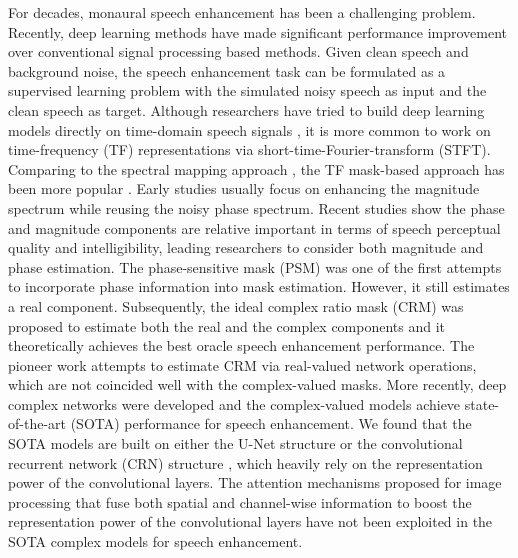 \documentclass{article}
\begin{document}
For decades, monaural speech enhancement has been a challenging problem. Recently, deep learning methods have made significant performance improvement over conventional signal processing based methods. Given clean speech and background noise, the speech enhancement task can be formulated as a supervised learning problem with the simulated noisy speech as input and the clean speech as target. Although researchers have tried to build deep learning models directly on time-domain speech signals \cite{Pascual2017, Rethage2018, Luo2019}, it is more common to work on time-frequency (TF) representations via short-time-Fourier-transform (STFT). Comparing to the spectral mapping approach \cite{Ronneberger2015}, the TF mask-based approach has been more popular \cite{Srinivasan2006, Narayanan2013, Wang2014}. Early studies usually focus on enhancing the magnitude spectrum while reusing the noisy phase spectrum. Recent studies show the phase and magnitude components are relative important in terms of speech perceptual quality and intelligibility, leading researchers to consider both magnitude and phase estimation. The phase-sensitive mask (PSM) \cite{Erdogan2015} was one of the first attempts to incorporate phase information into mask estimation. However, it still estimates a real component.  Subsequently, the ideal complex ratio mask (CRM) \cite{Williamson2015} was proposed to estimate both the real and the complex components and it theoretically achieves the best oracle speech enhancement performance.  The pioneer work \cite{Williamson2015} attempts to estimate CRM via real-valued network operations, which are not coincided well with the complex-valued masks. More recently, deep complex networks \cite{Trabelsi2018} were developed and the complex-valued models \cite{Choi2019, Isik2020, Hu2020} achieve state-of-the-art (SOTA) performance for speech enhancement. We found that the SOTA models \cite{Choi2019, Isik2020, Hu2020} are built on either the U-Net structure \cite{Ronneberger2015} or the convolutional recurrent network (CRN) structure \cite{Tan2018}, which heavily rely on the representation power of the convolutional layers. The attention mechanisms \cite{Hu2018, Woo2018} proposed for image processing that fuse both spatial and channel-wise information to boost the representation power of the convolutional layers have not been exploited in the SOTA complex models for speech enhancement.
\end{document}
